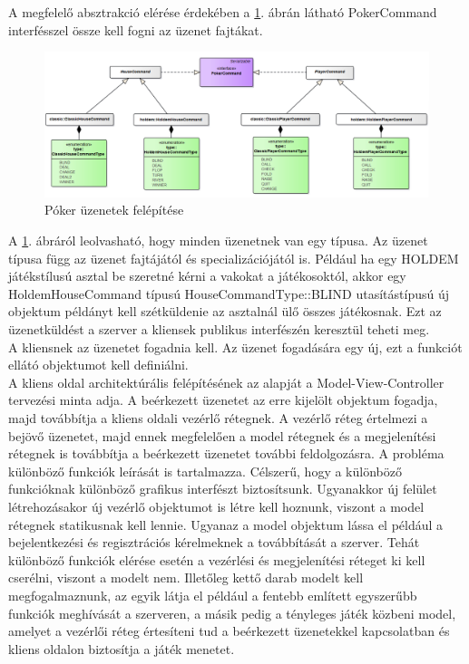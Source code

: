 A megfelelő absztrakció elérése érdekében a \ref{fig:messaging}. ábrán látható PokerCommand interfésszel össze kell fogni az üzenet fajtákat.
\begin{figure}[h!]
	\caption{Póker üzenetek felépítése}
	\label{fig:messaging}
	\centering
	\includegraphics[width=\linewidth]{developer-documentation/images/messaging.png}
\end{figure}
A \ref{fig:messaging}. ábráról leolvasható, hogy minden üzenetnek van egy típusa. Az üzenet típusa függ az üzenet fajtájától és specializációjától is. Például ha egy HOLDEM játékstílusú asztal be szeretné kérni a vakokat a játékosoktól, akkor egy HoldemHouseCommand típusú HouseCommandType::BLIND utasítástípusú új objektum példányt kell szétküldenie az asztalnál ülő összes játékosnak. Ezt az üzenetküldést a szerver a kliensek publikus interfészén keresztül teheti meg. \\
A kliensnek az üzenetet fogadnia kell. Az üzenet fogadására egy új, ezt a funkciót ellátó objektumot kell definiálni. \\
A kliens oldal architektúrális felépítésének az alapját a Model-View-Controller tervezési minta adja. A beérkezett üzenetet az erre kijelölt objektum fogadja, majd továbbítja a kliens oldali vezérlő rétegnek. A vezérlő réteg értelmezi a bejövő üzenetet, majd ennek megfelelően a model rétegnek és a megjelenítési rétegnek is továbbítja a beérkezett üzenetet további feldolgozásra. A probléma különböző funkciók leírását is tartalmazza. Célszerű, hogy a különböző funkcióknak különböző grafikus interfészt biztosítsunk. Ugyanakkor új felület létrehozásakor új vezérlő objektumot is létre kell hoznunk, viszont a model rétegnek statikusnak kell lennie. Ugyanaz a model objektum lássa el például a bejelentkezési és regisztrációs kérelmeknek a továbbítását a szerver. Tehát különböző funkciók elérése esetén a vezérlési és megjelenítési réteget ki kell cserélni, viszont a modelt nem. Illetőleg kettő darab modelt kell megfogalmaznunk, az egyik látja el például a fentebb említett egyszerűbb funkciók meghívását a szerveren, a másik pedig a tényleges játék közbeni model, amelyet a vezérlői réteg értesíteni tud a beérkezett üzenetekkel kapcsolatban és kliens oldalon biztosítja a játék menetet.  \\

